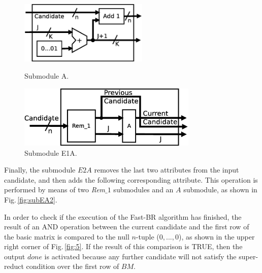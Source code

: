 \documentclass[authoryear,preprint,review,12pt]{elsarticle}
\begin{document}
\begin{figure}[htb]
\centering
\begin{minipage}{.5\textwidth}
  \centering
   \includegraphics[width=.7\linewidth , height=3cm]{Add1.eps}
  \caption{Submodule A.}
  \label{fig:subA}
\end{minipage}%
\begin{minipage}{.5\textwidth}
  \centering
   \includegraphics[width=\linewidth , height=3cm]{EA1.eps}
  \caption{Submodule E1A.}
  \label{fig:subEA1}
\end{minipage}
\end{figure}

Finally, the submodule $E2A$ removes the last two attributes from the
input candidate, and then adds the following corresponding attribute. This 
operation is performed by means of two \textit{Rem$\_1$} submodules and an $A$ submodule, as 
shown in Fig.\,\ref{fig:subEA2}.

In order to check if the execution of the Fast-BR  algorithm has finished, the result of an AND 
operation between the current candidate and the first row of the basic matrix is compared to 
the null $n$-tuple ($0,...,0$), as shown in the upper right corner of Fig.\,\ref{fig:5}. If the 
result of this comparison is TRUE, then the output $done$ is activated because any further 
candidate will not satisfy the super-reduct condition over the first row of $BM$.
\end{document}
